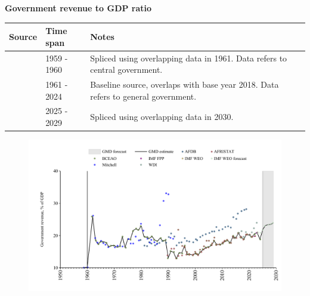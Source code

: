\documentclass[12pt,a4paper,landscape]{article}
\begin{document}
\begin{adjustbox}{max totalsize={\paperwidth}{\paperheight},center}
\begin{minipage}[t][\textheight][t]{\textwidth}
\vspace*{0.5cm}
{}
\begin{center}
{\Large\bfseries Government revenue to GDP ratio}
\end{center}
\vspace{0.5cm}
\begin{table}[H]
\centering
\small
\begin{tabular}{|l|l|l|}
\hline
\textbf{Source} & \textbf{Time span} & \textbf{Notes} \\
\hline
\rowcolor{white}\cite{Mitchell}& 1959 - 1960 &Spliced using overlapping data in 1961. Data refers to central government.\\
\rowcolor{lightgray}\cite{BCEAO}& 1961 - 2024 &Baseline source, overlaps with base year 2018. Data refers to general government.\\
\rowcolor{white}\cite{IMF_WEO_forecast}& 2025 - 2029 &Spliced using overlapping data in 2030. \\
\hline
\end{tabular}
\end{table}
\begin{figure}[H]
\centering
\includegraphics[width=\textwidth,height=0.6\textheight,keepaspectratio]{graphs/SEN_govrev_GDP.pdf}
\end{figure}
\end{minipage}
\end{adjustbox}
\end{document}
